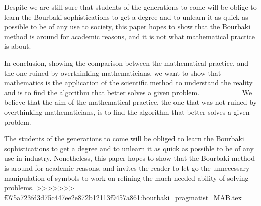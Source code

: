 \documentclass[]{scrartcl}
\theoremstyle{definition}
\begin{document}
Despite we are still sure that students of the generations to come will be oblige to learn the Bourbaki sophistications to get a degree and to unlearn it as quick as possible to be of any use to society, this paper hopes to show that the Bourbaki method is around for academic reasons, and it is not what mathematical practice is about.

In conclusion, showing the comparison between the mathematical practice, and the one ruined by overthinking mathematicians, we want to show that mathematics is the application of the scientific method to understand the reality and is to find the algorithm that better solves a given problem. 
=======
We believe that the aim of the mathematical practice, the one that was not ruined by overthinking mathematicians, is to find the algorithm that better solves a given problem. 

The students of the generations to come will be obliged to learn the Bourbaki sophistications to get a degree and to unlearn it as quick as possible to be of any use in industry. Nonetheless, this paper hopes to show that the Bourbaki method is around for academic reasons, and invites the reader to let go the unnecessary manipulation of symbols to work on refining the much needed ability of solving problems.
>>>>>>> f075a723fd3d75c447ee2e872b12113f9457a861:bourbaki_pragmatist_MAB.tex

 

\end{document}
